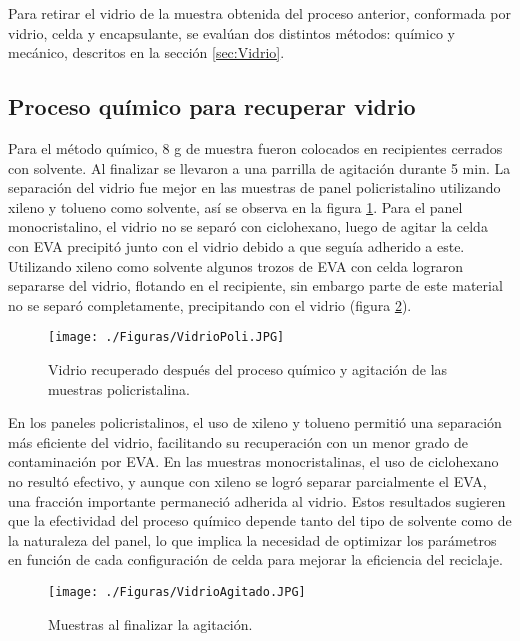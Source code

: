 Para retirar el vidrio de la muestra obtenida del proceso anterior, conformada por vidrio, celda y encapsulante, se evalúan dos distintos métodos: químico y mecánico, descritos en la sección \ref{sec:Vidrio}. 

\subsection{Proceso químico para recuperar vidrio}

Para el método químico, 8 g de muestra fueron colocados en recipientes cerrados con solvente. Al finalizar se llevaron a una parrilla de agitación durante 5 min. La separación del vidrio fue mejor en las muestras de panel policristalino utilizando xileno y tolueno como solvente, así se observa en la figura \ref{fig:VidrioPoli}. Para el panel monocristalino, el vidrio no se separó con ciclohexano, luego de agitar la celda con EVA precipitó junto con el vidrio debido a que seguía adherido a este. Utilizando xileno como solvente algunos trozos de EVA con celda lograron separarse del vidrio, flotando en el recipiente, sin embargo parte de este material no se separó completamente, precipitando con el vidrio (figura \ref{fig:VidrioAgitado}). 

\begin{figure}[htb]
	\begin{center}
		\texttt{[image: ./Figuras/VidrioPoli.JPG]}
	\end{center}
	\vspace{-1em} %
	\caption{Vidrio recuperado después del proceso químico y agitación de las muestras policristalina.}
	\label{fig:VidrioPoli}
\end{figure}

En los paneles policristalinos, el uso de xileno y tolueno permitió una separación más eficiente del vidrio, facilitando su recuperación con un menor grado de contaminación por EVA. En las muestras monocristalinas, el uso de ciclohexano no resultó efectivo, y aunque con xileno se logró separar parcialmente el EVA, una fracción importante permaneció adherida al vidrio. Estos resultados sugieren que la efectividad del proceso químico depende tanto del tipo de solvente como de la naturaleza del panel, lo que implica la necesidad de optimizar los parámetros en función de cada configuración de celda para mejorar la eficiencia del reciclaje.

\begin{figure}[htb]
	\begin{center}
		\texttt{[image: ./Figuras/VidrioAgitado.JPG]}
	\end{center}
	\vspace{-1em} %
	\caption{Muestras al finalizar la agitación.}
	\label{fig:VidrioAgitado}
\end{figure}

